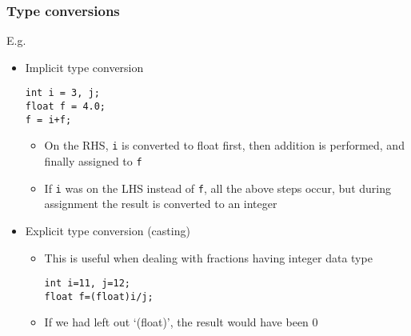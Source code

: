 \documentclass[11pt]{beamer}
\begin{document}
\begin{frame}[fragile]\frametitle{Type conversions}
\label{sec-1-17}

E.g.
\begin{itemize}
\item Implicit type conversion

\begin{verbatim}
int i = 3, j;
float f = 4.0;
f = i+f;
\end{verbatim}
\begin{itemize}
\item On the RHS, \verb~i~ is converted to float first, then addition is performed, and finally assigned to \verb~f~
\item If \verb~i~ was on the LHS instead of \verb~f~, all the above steps occur, but during assignment the result is converted to an integer
\end{itemize}
\item Explicit type conversion (casting)
\begin{itemize}
\item This is useful when dealing with fractions having integer data type

\begin{verbatim}
int i=11, j=12;
float f=(float)i/j;
\end{verbatim}
\end{itemize}

\begin{itemize}
\item If we had left out `(float)', the result would have been 0
\end{itemize}
\end{itemize}
\end{frame}
\end{document}
